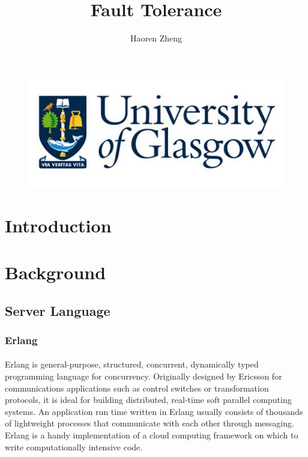 \documentclass{article}
\title{Fault Tolerance}
\author{Haoren Zheng}
\begin{document}
\begin{titlepage}
\begin{figure}[ht]
\includegraphics[scale=1]{Title.JPG}
\maketitle
\end{figure}
\end{titlepage}
\begin{abstract}
\end{abstract}
\tableofcontents
\section{Introduction}\vspace{24pt}
\section{Background}\vspace{24pt}
\subsection{Server Language}\vspace{18pt}
\subsubsection{Erlang}\vspace{16pt}
\paragraph{}\vspace{11pt}\justifying
Erlang is general-purpose, structured, concurrent, dynamically typed programming language for concurrency\cite{armstrong1993concurrent}. Originally designed by Ericsson for communications applications such as control switches or transformation protocols, it is ideal for building distributed, real-time soft parallel computing systems. An application run time written in Erlang usually consists of thousands of lightweight processes that communicate with each other through messaging. Erlang is a handy implementation of a cloud computing framework on which to write computationally intensive code.\\
\end{document}
